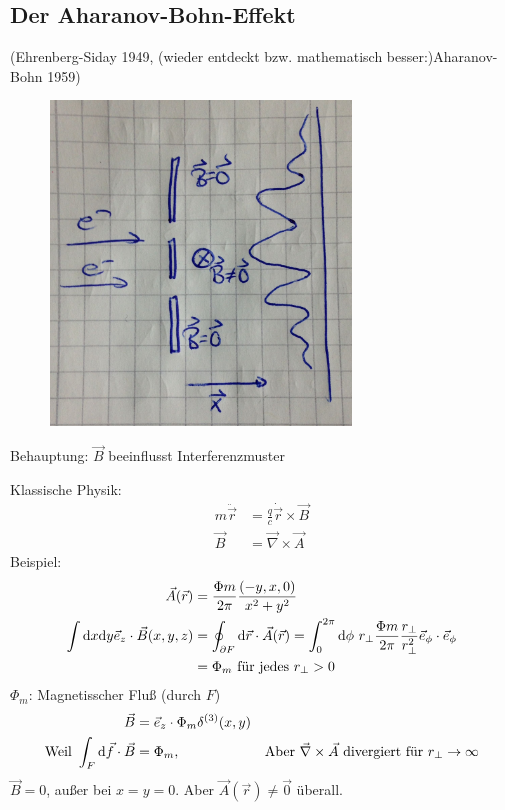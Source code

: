 \subsection{Der Aharanov-Bohn-Effekt} 
(Ehrenberg-Siday 1949, (wieder entdeckt bzw. mathematisch besser:)Aharanov-Bohn 1959)
	\begin{figure} [h]
	\begin{center}
		\includegraphics[width=8cm]{Aharanov-Bohn-Effekt1}
	\end{center}
	\end{figure}
Behauptung: $\vec{B}$ beeinflusst Interferenzmuster

Klassische Physik:
	\begin{align*}
		m \ddot{\vec{r}} &= \frac{q}{c} \dot{\vec{r}} \times \vec{B} \\
		\vec{B} &= \vec{\nabla} \times \vec{A}
	\end{align*}
Beispiel:
	\begin{align*}
		\vec{A}(\vec{r}) &= \frac{\Phi m}{2\pi} \frac{(-y,x,0)}{x^2 + y^2} \\
		\int \mathrm{d} x \mathrm{d} y \vec{e}_z \cdot \vec{B}(x,y,z) &=
		\oint_{\partial F} \mathrm{d} \vec{r} \cdot \vec{A}(\vec{r})=
		\int_{0}^{2 \pi} \mathrm{d} \phi ~r_{\perp} \frac{\Phi m}{2 \pi} \frac{r_{\perp}}{r_{\perp}^2} \vec{e}_\phi \cdot \vec{e}_\phi \\
		&=\Phi_m ~\text{für jedes } r_{\perp} > 0
	\end{align*}
$\Phi_m$: Magnetisscher Fluß (durch $F$)
	\begin{align*}
		\vec{B} &= \vec{e}_z \cdot \Phi_m \delta^{(3)}(x,y) \\
		\text{Weil } \int_F \mathrm{d} \vec{f} \cdot \vec{B} &= \Phi_m,&
		\text{Aber } \vec{\nabla} \times \vec{A} \text{ divergiert für } r_{\perp} \rightarrow \infty
	\end{align*}
$\vec{B} = 0$, außer bei $x=y=0$. Aber $\vec{A}(\vec{r}) \neq \vec{0}$ überall.

